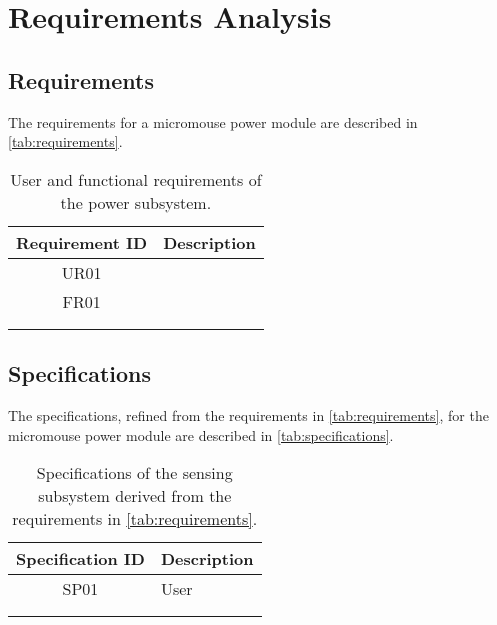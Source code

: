 \documentclass[class=report,11pt,crop=false]{standalone}
\begin{document}
\chapter{Requirements Analysis} \label{ch:reqAnalysis}
\vspace{-1cm}

\section{Requirements}
The requirements for a micromouse power module are described in \autoref{tab:requirements}.
\begin{table}[h]
    \centering
    \caption{User and functional requirements of the power subsystem.}    \label{tab:requirements}
    \begin{tabular}{c|l}
        \hline
        \textbf{ Requirement ID} & \textbf{Description} \\
        \hline
         UR01 & \\
         FR01 & \\
         &  \\
         &  \\
         \hline
    \end{tabular}
\end{table}

\section{Specifications}
The specifications, refined from the requirements in \autoref{tab:requirements}, for the micromouse power module are described in \autoref{tab:specifications}.
\begin{table}[h]
    \centering
    \caption{Specifications of the sensing subsystem derived from the requirements in \autoref{tab:requirements}.}    \label{tab:specifications}
    \begin{tabular}{c|l}
        \hline
        \textbf{Specification ID} & \textbf{Description} \\
        \hline
         SP01 & User \\
         &  \\
         &  \\
         \hline
    \end{tabular}
\end{table}
\end{document}
